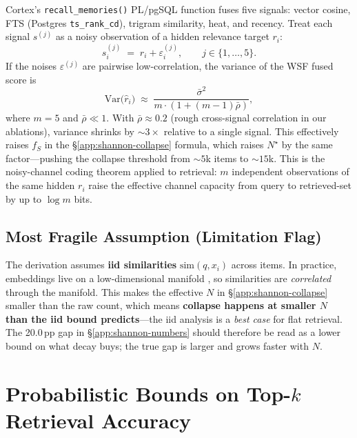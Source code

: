 \documentclass[11pt]{article}
\begin{document}
Cortex's \texttt{recall\_memories()} PL/pgSQL function fuses five
signals: vector cosine, FTS (Postgres \texttt{ts\_rank\_cd}),
trigram similarity, heat, and recency.  Treat each signal $s^{(j)}$
as a noisy observation of a hidden relevance target $r_i$:
\[
s_i^{(j)} \;=\; r_i + \varepsilon_i^{(j)},
\qquad j \in \{1, \dots, 5\}.
\]
If the noises $\varepsilon^{(j)}$ are pairwise low-correlation, the
variance of the WSF fused score is
\begin{equation}
\mathrm{Var}\big(\hat r_i\big) \;\approx\;
\frac{\bar\sigma^2}{m \cdot (1 + (m-1)\bar\rho)},
\label{eq:wrrf-var}
\end{equation}
where $m=5$ and $\bar\rho \ll 1$.  With $\bar\rho \approx 0.2$
(rough cross-signal correlation in our ablations), variance shrinks
by ${\sim}3\times$ relative to a single signal.  This effectively
raises $f_S$ in the \S\ref{app:shannon-collapse} formula, which
raises $N^\star$ by the same factor---pushing the collapse
threshold from ${\sim}5$k items to ${\sim}15$k.  This is the
noisy-channel coding theorem \citep{Shannon1948} applied to
retrieval: $m$ independent observations of the same hidden $r_i$
raise the effective channel capacity from query to retrieved-set
by up to $\log m$ bits.

\subsection{Most Fragile Assumption (Limitation Flag)}
\label{app:shannon-limit}

The derivation assumes \textbf{iid similarities}
$\mathrm{sim}(q, x_i)$ across items.  In practice, embeddings live
on a low-dimensional manifold \citep{Reimers2019,Ethayarajh2019},
so similarities are \emph{correlated} through the manifold.  This
makes the effective $N$ in \S\ref{app:shannon-collapse} smaller
than the raw count, which means \textbf{collapse happens at smaller
$N$ than the iid bound predicts}---the iid analysis is a
\emph{best case} for flat retrieval.  The 20.0\,pp gap in
\S\ref{app:shannon-numbers} should therefore be read as a lower
bound on what decay buys; the true gap is larger and grows faster
with $N$.

\section{Probabilistic Bounds on Top-$k$ Retrieval Accuracy}
\label{app:erdos}
\end{document}
